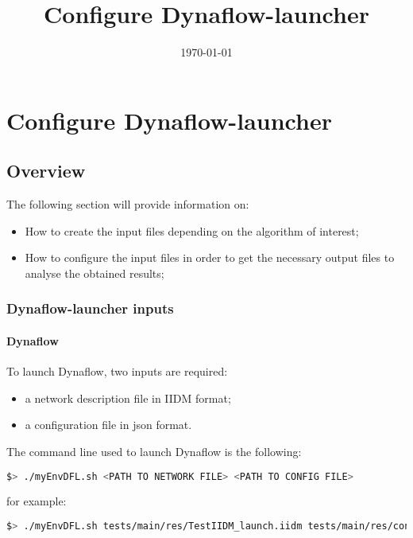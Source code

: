 \documentclass[a4paper, 12pt]{report}
\begin{document}
\title{Configure Dynaflow-launcher}
\date\today

\maketitle
\tableofcontents

\chapter[Configure Dynaflow-launcher]{Configure Dynaflow-launcher}

\section{Overview}

The following section will provide information on:
\begin{itemize}
\item How to create the input files depending on the algorithm of interest;
\item How to configure the input files in order to get the necessary output files to analyse the obtained results;
\end{itemize}


\subsection[Dynaflow-launcher inputs]{Dynaflow-launcher inputs}
\subsubsection{Dynaflow}

To launch Dynaflow, two inputs are required:
\begin{itemize}
  \item a network description file in IIDM format;
  \item a configuration file in json format.
\end{itemize}

The command line used to launch Dynaflow is the following:

\begin{lstlisting}[language=bash, breaklines=true, breakatwhitespace=false]
$> ./myEnvDFL.sh <PATH TO NETWORK FILE> <PATH TO CONFIG FILE>
\end{lstlisting}

for example:

\begin{lstlisting}[language=bash, breaklines=true, breakatwhitespace=false]
$> ./myEnvDFL.sh tests/main/res/TestIIDM_launch.iidm tests/main/res/config_launch.json
\end{lstlisting}
\end{document}
